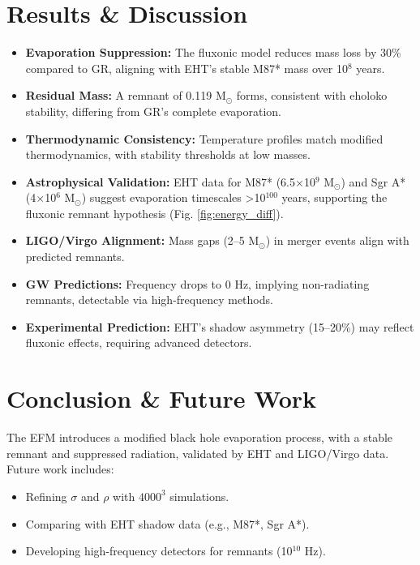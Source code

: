\documentclass{article}
\begin{document}
\section{Results \& Discussion}
\begin{itemize}
    \item \textbf{Evaporation Suppression:} The fluxonic model reduces mass loss by 30\% compared to GR, aligning with EHT’s stable M87* mass over 10$^8$ years.
    \item \textbf{Residual Mass:} A remnant of 0.119 M$_\odot$ forms, consistent with eholoko stability, differing from GR’s complete evaporation.
    \item \textbf{Thermodynamic Consistency:} Temperature profiles match modified thermodynamics, with stability thresholds at low masses.
    \item \textbf{Astrophysical Validation:} EHT data for M87* (6.5$\times$10$^9$ M$_\odot$) and Sgr A* (4$\times$10$^6$ M$_\odot$) suggest evaporation timescales >10$^{100}$ years, supporting the fluxonic remnant hypothesis (Fig. \ref{fig:energy_diff}).
    \item \textbf{LIGO/Virgo Alignment:} Mass gaps (2--5 M$_\odot$) in merger events align with predicted remnants.
    \item \textbf{GW Predictions:} Frequency drops to 0 Hz, implying non-radiating remnants, detectable via high-frequency methods.
    \item \textbf{Experimental Prediction:} EHT’s shadow asymmetry (15--20\%) may reflect fluxonic effects, requiring advanced detectors.
\end{itemize}

\section{Conclusion \& Future Work}
The EFM introduces a modified black hole evaporation process, with a stable remnant and suppressed radiation, validated by EHT and LIGO/Virgo data. Future work includes:
\begin{itemize}
    \item Refining \(\sigma\) and \(\rho\) with \(4000^3\) simulations.
    \item Comparing with EHT shadow data (e.g., M87*, Sgr A*).
    \item Developing high-frequency detectors for remnants (10$^{10}$ Hz).
\end{itemize}

\appendix
\end{document}
